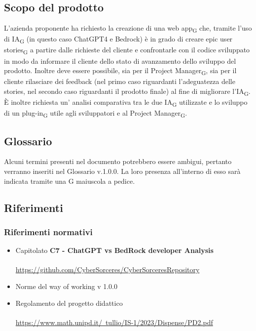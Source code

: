 \documentclass{article}
\begin{document}
\subsection*{Scopo del prodotto}
L'azienda proponente ha richiesto la creazione di una web app\textsubscript{G} che, tramite l'uso di IA\textsubscript{G} (in questo caso ChatGPT4 e Bedrock) è in grado di creare epic user stories\textsubscript{G} a partire dalle richieste del cliente e confrontarle con il codice sviluppato in modo da informare il cliente dello stato di avanzamento dello sviluppo del prodotto. Inoltre deve essere possibile, sia per il Project Manager\textsubscript{G}, sia per il cliente rilasciare dei feedback (nel primo caso riguardanti l'adeguatezza delle stories, nel secondo caso riguardanti il prodotto finale) al fine di migliorare l'IA\textsubscript{G}. È inoltre richiesta un' analisi comparativa tra le due IA\textsubscript{G} utilizzate e lo sviluppo di un plug-in\textsubscript{G} utile agli sviluppatori e al Project Manager\textsubscript{G}.

\subsection*{Glossario}
Alcuni termini presenti nel documento potrebbero essere ambigui, pertanto verranno inseriti nel Glossario v.1.0.0. La loro presenza all'interno di esso sarà indicata tramite una G maiuscola a pedice.

\subsection*{Riferimenti}
\subsubsection{Riferimenti normativi}
\begin{itemize}
    \item Capitolato \textbf{C7 - ChatGPT vs BedRock developer Analysis}
    \\ \\
       \href{https://github.com/CyberSorceres/CyberSorceresRepository}{https://github.com/CyberSorceres/CyberSorceresRepository} 
    \item Norme del way of working v 1.0.0
    \item Regolamento del progetto didattico \\ \\ \href{https://www.math.unipd.it/~tullio/IS-1/2023/Dispense/PD2.pdf} 
    {https://www.math.unipd.it/~tullio/IS-1/2023/Dispense/PD2.pdf}
\end{itemize}
\end{document}
